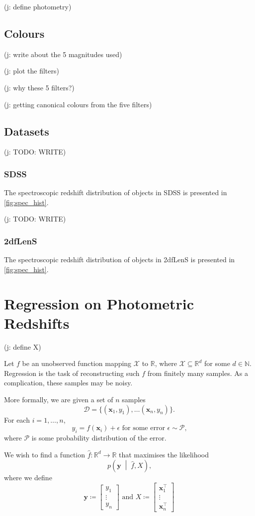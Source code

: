 \documentclass[11pt,twoside]{report}
\newcommand\bx{\mathbf{x}}
\newcommand\by{\mathbf{y}}
\newcommand\bbN{\mathbb{N}}
\newcommand\bbR{\mathbb{R}}
\newcommand\cD{\mathcal{D}}
\newcommand\cP{\mathcal{P}}
\newcommand\cX{\mathcal{X}}
\newcommand\jakub[1]{{\color{red}(j: #1)}}
\begin{document}
  \jakub{define photometry}

  \section{Colours}

  \jakub{write about the 5 magnitudes used}

  \jakub{plot the filters}

  \jakub{why these 5 filters?}

  \jakub{getting canonical colours from the five filters}

  \section{Datasets}
  \jakub{TODO: WRITE}

  \subsection{SDSS}
  The spectroscopic redshift distribution of objects in SDSS is presented in \cref{fig:spec_hist}.

  \jakub{TODO: WRITE}

  \subsection{2dfLenS}
  The spectroscopic redshift distribution of objects in 2dfLenS is presented in \cref{fig:spec_hist}.

\chapter{Regression on Photometric Redshifts}

\jakub{define X}

Let $f$ be an unobserved function mapping $\cX$ to $\bbR$, where $\cX \subseteq \bbR^d$ for some $d \in \bbN$. Regression is the task of reconstructing such $f$ from finitely many samples. As a complication, these samples may be noisy.

More formally, we are given a set of $n$ samples\[
    \cD = \{(\bx_1, y_1), \dots (\bx_n, y_n)\} \text{.}
\] For each $i = 1, \dots, n$, \[
    y_i = f(\bx_i) + \epsilon \text{ for some error } \epsilon \sim \cP \text{,}
\] where $\cP$ is some probability distribution of the error.

We wish to find a function $\hat f : \bbR^d \to \bbR$ that maximises the likelihood \[
    p\left(\by \;\middle|\; \hat f, X\right) \text{,}
\] where we define\[
    \by \coloneqq \begin{bmatrix} y_1 \\ \vdots \\ y_n \end{bmatrix}
    \text{ and }
    X \coloneqq \begin{bmatrix} \bx_1^\intercal \\ \vdots \\ \bx_n^\intercal \end{bmatrix}
\]
\end{document}
